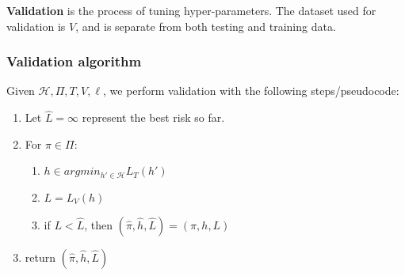\documentclass[titlepage, 12pt, leqno]{article}
\begin{document}
\begin{definition}
    \textbf{Validation} is the process of tuning hyper-parameters. The dataset
    used for validation is $V$, and is separate from both testing and training
    data.
\end{definition}

\pagebreak
\subsubsection{Validation algorithm}
Given $ \mathcal{H}, \Pi, T, V, \ell$, we perform validation with the following
steps/pseudocode:

\begin{enumerate}
    \item Let $\hat L = \infty$ represent the best risk so far.
    \item For $\pi \in \Pi$:
        \begin{enumerate}
            \item $h \in argmin_{h' \in \mathcal{H}}L_{T}(h')$
            \item $L = L_{V}(h)$
            \item if $L < \hat L$, then $(\hat \pi, \hat h, \hat L) =
                (\pi, h, L)$
        \end{enumerate}
    \item return $(\hat \pi, \hat h, \hat L)$
\end{enumerate}
\end{document}
